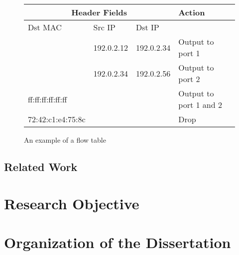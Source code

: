 \begin{figure}
    \centering
    \begin{tabular}{lllll}
        \hline
        \multicolumn{3}{c}{Header Fields}            &  Action                  \\ \hline
        Dst MAC           & Src IP     & Dst IP      &                          \\ \hline
                          & 192.0.2.12 & 192.0.2.34  & Output to port 1         \\
                          & 192.0.2.34 & 192.0.2.56  & Output to port 2         \\
        ff:ff:ff:ff:ff:ff &            &             & Output to port 1 and 2   \\
        72:42:c1:e4:75:8c &            &             & Drop
    \end{tabular}
    \caption{An example of a flow table}%
    \label{tbl:flow-table}
\end{figure}

\subsection{Related Work}

\section{Research Objective}

\section{Organization of the Dissertation}
